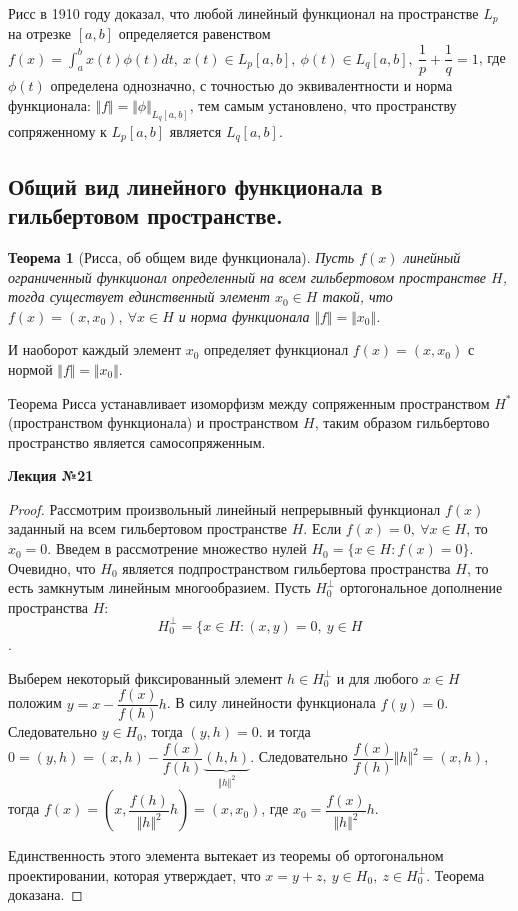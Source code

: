 \documentclass[14pt,a4paper]{extarticle}
\newtheorem{theorem}{Теорема}[section]
\theoremstyle{definition}
\theoremstyle{remark}
\renewcommand{\[}{\begin{dmath*}[compact]}
\renewcommand{\]}{\end{dmath*}}
\newcommand{\ds}{\displaystyle}
\newcommand{\sep}{ , \ \allowbreak }
\newcommand\fr[2]{\dfrac{#1}{#2}}
\begin{document}
Рисс в 1910 году доказал, что любой линейный функционал на
пространстве $L_p$ на отрезке $[a,b]$ определяется равенством
$\ds f(x) = \int_a^b x(t) \phi(t) dt \sep x(t) \in L_p[a,b] \sep
\phi(t) \in L_q[a,b] \sep \fr{1}p+\fr{1}q=1$, где $\phi(t)$ определена однозначно,
с точностью до эквивалентности и норма функционала:
$\Vert f \Vert = \Vert \phi \Vert_{L_q[a,b]}$,
тем самым установлено, что пространству сопряженному к $L_p[a,b]$
является $L_q[a,b]$.

\subsection{Общий вид линейного функционала в гильбертовом пространстве.}

\begin{theorem}[Рисса, об общем виде функционала]
  Пусть $f(x)$ линейный ограниченный функционал определенный на всем
  гильбертовом пространстве $H$, тогда существует единственный элемент
  $x_0 \in H$ такой, что $f(x)=(x,x_0) \sep \forall x \in H$
  и норма функционала $\Vert f \Vert = \Vert x_0 \Vert$.
\end{theorem}

И наоборот каждый элемент $x_0$ определяет функционал $f(x)=(x,x_0)$ с нормой
$\Vert f \Vert = \Vert x_0 \Vert$.

Теорема Рисса устанавливает изоморфизм между сопряженным пространством $H^*$
(пространством функционала) и пространством $H$,
таким образом гильбертово пространство является самосопряженным.

\textbf{Лекция №21}

\begin{proof}
  Рассмотрим произвольный линейный непрерывный функционал $f(x)$
  заданный на всем гильбертовом пространстве $H$.
  Если $f(x)=0 \sep \forall x \in H$, то $x_0=0$.
  Введем в рассмотрение множество нулей $H_0 = \{x \in H : f(x) = 0\}$.
  Очевидно, что $H_0$ является подпространством гильбертова пространства $H$,
  то есть замкнутым линейным многообразием.
  Пусть $H_0^\bot$ ортогональное дополнение пространства $H$:
  \[H_0^\bot = \{x \in H: (x,y)=0 \sep y \in H\].

  Выберем некоторый фиксированный элемент $h \in H_0^\bot$
  и для любого $x \in H$ положим $y=x- \fr{f(x)}{f(h)}h$.
  В силу линейности функционала $f(y)=0$.
  Следовательно $y \in H_0$, тогда $(y,h)=0$.
  и тогда $0=(y,h)=(x,h)-\fr{f(x)}{f(h)}\underbrace{(h,h)}_{\Vert h \Vert ^2}$.
  Следовательно $\fr{f(x)}{f(h)} \Vert h \Vert ^2 = (x,h)$,
  тогда $f(x)= (x,\fr{f(h)}{\Vert h \Vert ^2} h)=(x,x_0)$,
  где $x_0=\fr{f(x)}{\Vert h \Vert^2}h$.

  Единственность этого элемента вытекает из теоремы об ортогональном
  проектировании, которая утверждает, что
  $x=y+z \sep y \in H_0 \sep z \in H_0^\bot$.
  Теорема доказана.
\end{proof}
\end{document}
